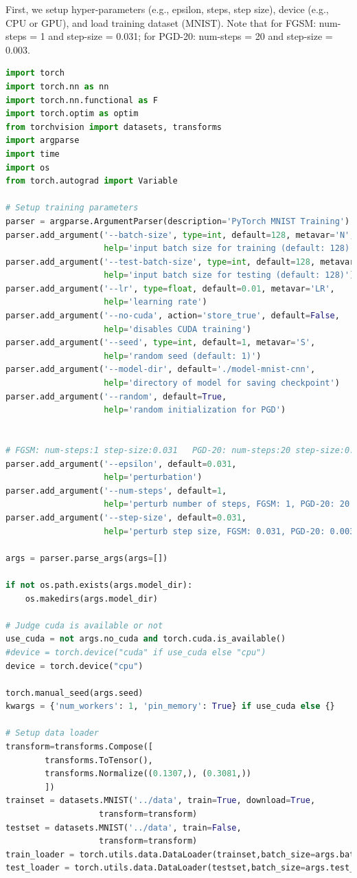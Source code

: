 First, we setup hyper-parameters (e.g., epsilon, steps, step size), device (e.g., CPU or GPU), and load training dataset (MNIST). Note that for FGSM: num-steps = 1 and  step-size = 0.031; for PGD-20: num-steps = 20 and step-size = 0.003.  
\begin{lstlisting}[language=Python]
import torch
import torch.nn as nn
import torch.nn.functional as F
import torch.optim as optim
from torchvision import datasets, transforms
import argparse
import time
import os
from torch.autograd import Variable

# Setup training parameters
parser = argparse.ArgumentParser(description='PyTorch MNIST Training')
parser.add_argument('--batch-size', type=int, default=128, metavar='N',
                    help='input batch size for training (default: 128)')
parser.add_argument('--test-batch-size', type=int, default=128, metavar='N',
                    help='input batch size for testing (default: 128)')
parser.add_argument('--lr', type=float, default=0.01, metavar='LR',
                    help='learning rate')
parser.add_argument('--no-cuda', action='store_true', default=False,
                    help='disables CUDA training')
parser.add_argument('--seed', type=int, default=1, metavar='S',
                    help='random seed (default: 1)')
parser.add_argument('--model-dir', default='./model-mnist-cnn',
                    help='directory of model for saving checkpoint')
parser.add_argument('--random', default=True,
                    help='random initialization for PGD')


# FGSM: num-steps:1 step-size:0.031   PGD-20: num-steps:20 step-size:0.003  
parser.add_argument('--epsilon', default=0.031,
                    help='perturbation')
parser.add_argument('--num-steps', default=1,
                    help='perturb number of steps, FGSM: 1, PGD-20: 20')
parser.add_argument('--step-size', default=0.031,
                    help='perturb step size, FGSM: 0.031, PGD-20: 0.003')

args = parser.parse_args(args=[]) 

if not os.path.exists(args.model_dir):
    os.makedirs(args.model_dir)
        
# Judge cuda is available or not
use_cuda = not args.no_cuda and torch.cuda.is_available()
#device = torch.device("cuda" if use_cuda else "cpu")
device = torch.device("cpu")

torch.manual_seed(args.seed)
kwargs = {'num_workers': 1, 'pin_memory': True} if use_cuda else {}

# Setup data loader
transform=transforms.Compose([
        transforms.ToTensor(),
        transforms.Normalize((0.1307,), (0.3081,))
        ])
trainset = datasets.MNIST('../data', train=True, download=True,
                   transform=transform)
testset = datasets.MNIST('../data', train=False,
                   transform=transform)
train_loader = torch.utils.data.DataLoader(trainset,batch_size=args.batch_size, shuffle=True,**kwargs)
test_loader = torch.utils.data.DataLoader(testset,batch_size=args.test_batch_size, shuffle=False, **kwargs)
\end{lstlisting}



